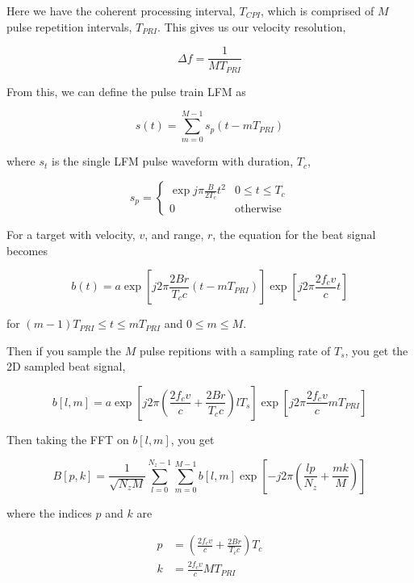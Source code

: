 \documentclass[preview]{standalone}
\begin{document}
\begin{center}
Here we have the coherent processing interval, $T_{CPI}$, which is comprised of $M$ pulse repetition intervals, $T_{PRI}$. This gives us our velocity resolution, 

\begin{equation}
    \Delta f = \frac{1}{M T_{PRI}}
\end{equation}

From this, we can define the pulse train LFM as

\begin{equation}
    s(t) = \sum_{m=0}^{M-1} s_p(t - m T_{PRI})
\end{equation}

where $s_t$ is the single LFM pulse waveform with duration, $T_c$,

\begin{equation}
    s_p = \begin{cases} 
      \exp{j \pi \frac{B}{2 T_c} t^2} & 0 \le t \le T_c \\
      0 & \text{otherwise}
   \end{cases}
\end{equation}

For a target with velocity, $v$, and range, $r$, the equation for the beat signal becomes

\begin{equation}
    b(t) = a \exp{\left[ j 2 \pi \frac{2 B r}{T_c c} (t - m T_{PRI}) \right]} \exp{\left[ j 2 \pi \frac{2 f_c v}{c} t \right]}
\end{equation}

for $(m-1) T_{PRI} \le t \le m T_{PRI}$ and $0 \le m \le M$.

Then if you sample the $M$ pulse repitions with a sampling rate of $T_s$, you get the 2D sampled beat signal,

\begin{equation}
    b[l, m] = a \exp{\left[ j 2 \pi \left( \frac{2 f_c v}{c} + \frac{2 B r}{T_c c} \right) l T_s \right]} \exp{\left[ j 2 \pi \frac{2 f_c v}{c} m T_{PRI} \right]}
\end{equation}

Then taking the FFT on $b[l, m]$, you get

\begin{equation}
    B[p, k] = \frac{1}{\sqrt{N_z M}} \sum_{l=0}^{N_z-1} \sum_{m=0}^{M-1} b[l, m] \exp{\left[ -j 2 \pi \left( \frac{lp}{N_z} + \frac{mk}{M} \right) \right]}
\end{equation}

where the indices $p$ and $k$ are

\begin{equation}
\begin{align}
    p &= \left( \frac{2 f_c v}{c} + \frac{2 B r}{T_c c} \right)T_c \\
    k &= \frac{2 f_c v}{c} M T_{PRI}
\end{align}
\end{equation}
\end{center}
\end{document}
